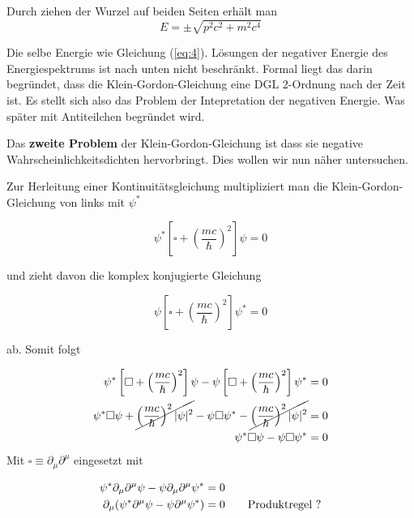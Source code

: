 Durch ziehen der Wurzel auf beiden Seiten erhält man 
\begin{equation}
  \label{eq:11}
  E =\pm \sqrt{ p^2c^2  + m^2c^4 }
\end{equation}

Die selbe Energie wie Gleichung (\ref{eq:4}). Lösungen der negativer Energie des Energiespektrums ist nach unten nicht beschränkt. Formal liegt das darin begründet, dass die Klein-Gordon-Gleichung eine DGL 2-Ordnung nach der Zeit ist. Es stellt sich also das Problem der Intepretation der negativen Energie. Was später mit Antiteilchen begründet wird.

Das \textbf{zweite Problem} der Klein-Gordon-Gleichung ist dass sie negative Wahrscheinlichkeitsdichten hervorbringt. Dies wollen wir nun näher untersuchen.

Zur Herleitung einer Kontinuitätsgleichung multipliziert man die Klein-Gordon-Gleichung von links mit \(\psi^*\)

\begin{equation}
  \label{eq:12}
  \psi^*\left[  \square + \left(\frac{mc}{\hbar}\right)^2\right]\psi  = 0
\end{equation}

und zieht davon die komplex konjugierte Gleichung

\begin{equation}
  \label{eq:13}
  \psi \left[  \square + \left(\frac{mc}{\hbar}\right)^2\right]\psi^*  = 0
\end{equation}

ab. Somit folgt

\begin{align}
  \label{eq:14}
   \psi^*\left[  \square + \left(\frac{mc}{\hbar}\right)^2\right]\psi - \psi \left[  \square + \left(\frac{mc}{\hbar}\right)^2\right]\psi^* &= 0 \\
   \psi^* \square \psi  +  \cancel{\left(\frac{mc}{\hbar}\right)^2 |\psi|^2} - \psi \square\psi^* - \cancel{ \left(\frac{mc}{\hbar}\right)^2|\psi|^2 }  &= 0 \\
   \psi^* \square \psi  - \psi \square\psi^*  &= 0 \\
\end{align}
Mit \(\square \equiv \partial_\mu\partial^\mu \) eingesetzt mit 


\begin{align}
  \label{eq:15}
     \psi^* \partial_\mu\partial^\mu  \psi  - \psi \partial_\mu\partial^\mu\psi^*  &= 0 \notag \\
   \partial_\mu(  \psi^* \partial^\mu  \psi  - \psi \partial^\mu\psi^* ) &= 0 \qquad \text{Produktregel ?}
\end{align}

